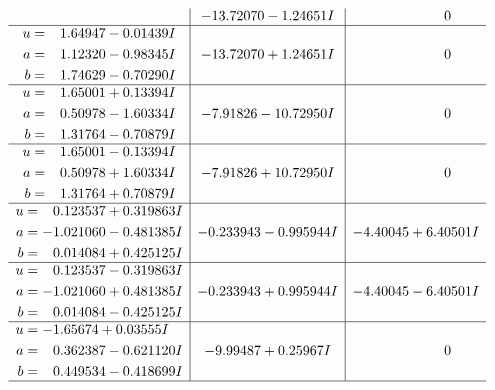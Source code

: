\documentclass[1p]{elsarticle_modified}
\theoremstyle{definition}
\begin{document}
$$\begin{array}{c|c|c}
 & -13.72070 - 1.24651 I & \phantom{-0.000000 } 0 \\ \hline\begin{aligned}
u &= \phantom{-}1.64947 - 0.01439 I \\
a &= \phantom{-}1.12320 - 0.98345 I \\
b &= \phantom{-}1.74629 - 0.70290 I\end{aligned}
 & -13.72070 + 1.24651 I & \phantom{-0.000000 } 0 \\ \hline\begin{aligned}
u &= \phantom{-}1.65001 + 0.13394 I \\
a &= \phantom{-}0.50978 - 1.60334 I \\
b &= \phantom{-}1.31764 - 0.70879 I\end{aligned}
 & -7.91826 - 10.72950 I & \phantom{-0.000000 } 0 \\ \hline\begin{aligned}
u &= \phantom{-}1.65001 - 0.13394 I \\
a &= \phantom{-}0.50978 + 1.60334 I \\
b &= \phantom{-}1.31764 + 0.70879 I\end{aligned}
 & -7.91826 + 10.72950 I & \phantom{-0.000000 } 0 \\ \hline\begin{aligned}
u &= \phantom{-}0.123537 + 0.319863 I \\
a &= -1.021060 - 0.481385 I \\
b &= \phantom{-}0.014084 + 0.425125 I\end{aligned}
 & -0.233943 - 0.995944 I & -4.40045 + 6.40501 I \\ \hline\begin{aligned}
u &= \phantom{-}0.123537 - 0.319863 I \\
a &= -1.021060 + 0.481385 I \\
b &= \phantom{-}0.014084 - 0.425125 I\end{aligned}
 & -0.233943 + 0.995944 I & -4.40045 - 6.40501 I \\ \hline\begin{aligned}
u &= -1.65674 + 0.03555 I \\
a &= \phantom{-}0.362387 - 0.621120 I \\
b &= \phantom{-}0.449534 - 0.418699 I\end{aligned}
 & -9.99487 + 0.25967 I & \phantom{-0.000000 } 0\\
 \hline 
 \end{array}$$\newpage$$\begin{array}{c|c|c}  

\end{array}$$
\end{document}
